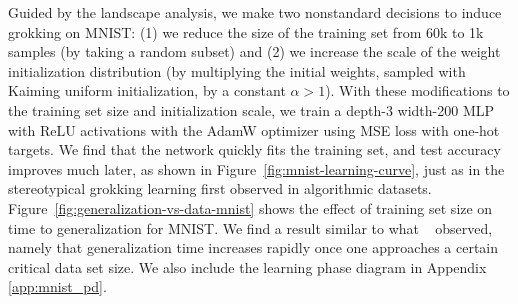 \documentclass{article} %
\begin{document}


Guided by the landscape analysis, we make two nonstandard decisions to induce grokking on MNIST: (1) we reduce the size of the training set from 60k to 1k samples (by taking a random subset) and (2) we increase the scale of the weight initialization distribution (by multiplying the initial weights, sampled with Kaiming uniform initialization, by a constant $\alpha>1$). With these modifications to the training set size and initialization scale, we train a depth-3 width-200 MLP with ReLU activations with the AdamW optimizer using MSE loss with one-hot targets. We find that the network quickly fits the training set, and test accuracy improves much later, as shown in Figure~\ref{fig:mnist-learning-curve}, just as in the stereotypical grokking learning first observed in algorithmic datasets.  Figure~\ref{fig:generalization-vs-data-mnist} shows the effect of training set size on time to generalization for MNIST. We find a result similar to what ~\citep{power2022grokking} observed, namely that generalization time increases rapidly once one approaches a certain critical data set size. We also include the learning phase diagram in Appendix \ref{app:mnist_pd}.



\end{document}
